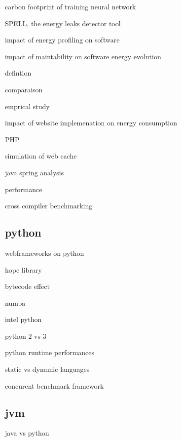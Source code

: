 carbon footprint of training neural network \cite{strubell2019energy}

SPELL, the energy leaks detector tool \cite{pereira2017helping}

impact of energy profiling on software \cite{jagroep2017energy}

impact of maintability on software energy evolution \cite{calero2021does}

defintion \cite{wang1993grpc}

comparaison \cite{chamas2017comparing}

emprical study \cite{de2021empirical}

impact of website implemenation on energy consumption \cite{philippot_characterization_2014} \cite{manotas2013investigating}

PHP \cite{benmoussa_new_2019} \cite{das_comparison_2016}

simulation of web cache \cite{cardenas_performance_2005}

java spring analysis \cite{gajewski_analysis_2019}

performance \cite{mishra2021web}


cross compiler benchmarking \cite{yet2016cross}

\subsection{python}

webframeworks on python \cite{pankiv_concurrent_nodate}

hope library \cite{akeret_hope_2015}

bytecode effect \cite{ben_asher_effect_2009}

numba \cite{crist_dask_2016}

intel python \cite{li_boosting_2016}

python 2 vs 3 \cite{modzelewski_pyston_2020}

python runtime performances \cite{redondo_comprehensive_2015} \cite{murri_performance_2013}

static vs dynamic languages \cite{pang_what_nodate}

concurent benchmark framework \cite{pankiv2019concurrent}


\subsection{jvm}

java vs python \cite{destefanis_statistical_2016}

